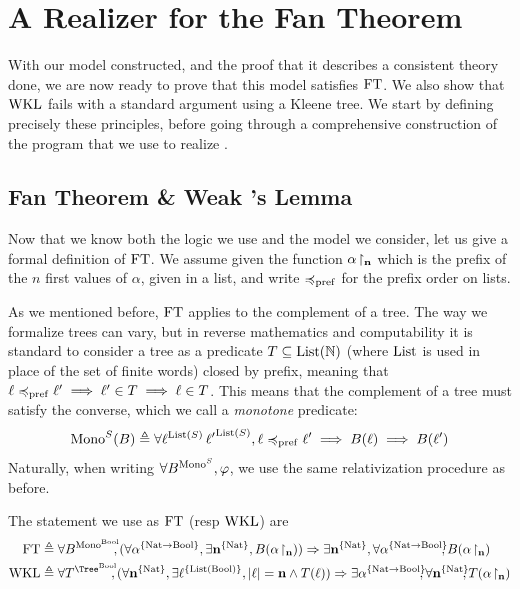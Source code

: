 \documentclass[a4paper,UKenglish,cleveref, autoref, thm-restate]{lipics-v2021}
\begin{document}
\section{A Realizer for the Fan Theorem}
\label{s:FT}
With our model constructed, and the proof that it describes
a consistent theory done, we are now ready to prove
that this model satisfies $\mathrm{FT}$. We also show
that $\mathrm{WKL}$ fails with a standard argument using a Kleene tree.
We start by defining precisely these principles, before going through a comprehensive
construction of the program that we use to realize \FT.
\subsection{Fan Theorem \& Weak \Konig's Lemma}

Now that we know both the logic we use and the model we consider,
let us give a formal definition of $\mathrm{FT}$.
We assume given the function ${\alpha}\!\upharpoonright_{\mathbf{n}}$ which is the
prefix of the $n$ first values of $\alpha$, given in a list,
and write $\preccurlyeq_{\mathrm{pref}}$ for the prefix order on lists.

As we mentioned before, $\mathrm{FT}$ applies to the complement of a tree.
The way we formalize trees can vary, but in reverse mathematics and computability
it is standard to consider a tree as a predicate $T \subseteq \mathrm{List}(\mathbb N)$
(where $\mathrm{List}$ is used in place of the set of finite words) closed by prefix,
meaning that $\ell \preccurlyeq_{\mathrm{pref}} \ell' \implies \ell' \in T \implies \ell \in T$.
This means that the complement of a tree must satisfy the converse,
which we call a \emph{monotone} predicate:
\[\mathrm{Mono}^S(B) \triangleq \forall \ell^{\mathrm{List}(S)}\,{\ell'}^{\mathrm{List}(S)}, \ell \preccurlyeq_{\mathrm{pref}} \ell' \implies B(\ell) \implies B(\ell')\]
Naturally, when writing $\forall B^{\mathrm{Mono}^S}, \varphi$, we use the same relativization procedure as before.

The statement we use as $\mathrm{FT}$ (resp $\mathrm{WKL}$) are
\begin{align*}
\FT&\defeq \forall B^{\Mono^\Bool}\!\!\!, (\forall \alpha^{\{\Nat \to \Bool\}}, \exists \varn^{\{\Nat\}}, B(\restr\alpha \varn)) \Rightarrow
\exists \varn^{\{\Nat\}}, \forall \alpha^{\{\Nat\to\Bool\}}\!\!\!, B(\restr \alpha \varn)\\
\WKL&\defeq \forall T^{\Tree^\Bool}\!\!\!, (\forall \varn^{\{\Nat\}}, \exists \ell^{\{\List(\Bool)\}}, |\ell| = \varn \land T(\ell)) \Rightarrow
        \exists \alpha^{\{\Nat \to \Bool\}}\!\!\!, \forall \varn^{\{\Nat\}}\!\!\!, T(\restr \alpha \varn)
\end{align*}
\end{document}
